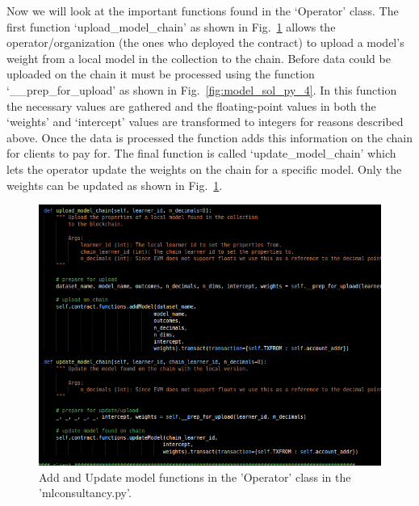\noindent
Now we will look at the important functions found in the ‘Operator’ class. The first function ‘upload\_model\_chain’ as shown in Fig.~\ref{fig:model_sol_py_3} allows the operator/organization (the ones who deployed the contract) to upload a model’s weight from a local model in the collection to the chain. Before data could be uploaded on the chain it must be processed using the function ‘\_\_prep\_for\_upload’ as shown in Fig.~\ref{fig:model_sol_py_4}. In this function the necessary values are gathered and the floating-point values in both the ‘weights’ and ‘intercept’ values are transformed to integers for reasons described above. Once the data is processed the function adds this information on the chain for clients to pay for. The final function is called ‘update\_model\_chain’ which lets the operator update the weights on the chain for a specific model. Only the weights can be updated as shown in Fig.~\ref{fig:model_sol_py_3}. 

\begin{figure}[H]
\centering
  \includegraphics[scale = .52]{imgs/model_sol_py_3.png}
  \caption{Add and Update model functions in the 'Operator' class in the 'mlconsultancy.py'.}
  \label{fig:model_sol_py_3}
\end{figure}

